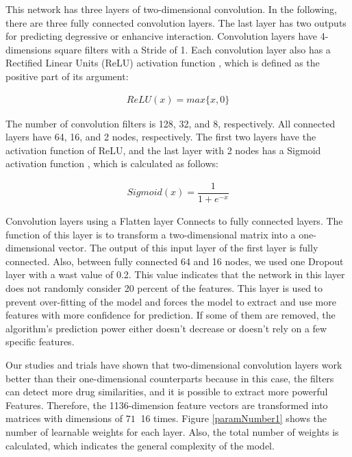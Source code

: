 \documentclass{bmcart}
\begin{document}
This network has three layers of two-dimensional convolution. In the following, there are three fully connected convolution layers. The last layer has two outputs for predicting degressive or enhancive interaction. Convolution layers have 4-dimensions square filters with a Stride of 1. Each convolution layer also has a Rectified Linear Units (ReLU) activation function \cite{nair2010rectified}, which is defined as the positive part of its argument:

\begin{equation}
	\begin{aligned}
		ReLU(x) = max \{x, 0\}
	\end{aligned}
\end{equation}

The number of convolution filters is 128, 32, and 8, respectively. All connected layers have 64, 16, and 2 nodes, respectively. The first two layers have the activation function of ReLU, and the last layer with 2 nodes has a Sigmoid activation function \cite{hinton2012deep}, which is calculated as follows:

\begin{equation}
	\begin{aligned}
		Sigmoid(x) = \dfrac{1}{1 + e^{-x}}
	\end{aligned}
\end{equation}

Convolution layers using a Flatten layer Connects to fully connected layers. The function of this layer is to transform a two-dimensional matrix into a one-dimensional vector. The output of this input layer of the first layer is fully connected. Also, between fully connected 64 and 16 nodes, we used one Dropout layer \cite{srivastava2014dropout} with a wast value of 0.2. This value indicates that the network in this layer does not randomly consider 20 percent of the features. This layer is used to prevent over-fitting of the model and forces the model to extract and use more features with more confidence for prediction. If some of them are removed, the algorithm's prediction power either doesn't decrease or doesn't rely on a few specific features.

Our studies and trials have shown that two-dimensional convolution layers work better than their one-dimensional counterparts because in this case, the filters can detect more drug similarities, and it is possible to extract more powerful Features. Therefore, the 1136-dimension  feature vectors are transformed into matrices with dimensions of $ 71 \ $ 16 times. Figure
\ref{paramNumber1} 
shows the number of learnable weights for each layer. Also, the total number of weights is calculated, which indicates the general complexity of the model.
\end{document}
